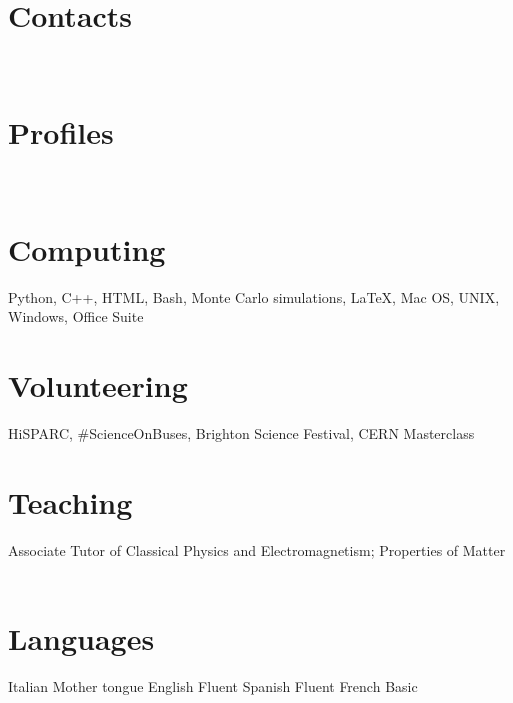 \documentclass[print]{cv} %
\newcommand{\profilepic}[1]{\renewcommand{\profilepic}{#1}}
\newlength\imagewidth
\newlength\imagescale
\begin{document}


\begin{aside} %
  \section{Contacts}
    \cvmail
    \cvnumberphone
    \cvaddress
  ~
  \section{Profiles}
    \cvsite
    \cvlinkedin
    \cvsussex
    \cvgit
  ~
  \section{Computing} 
      Python, C++, HTML, 
      Bash, Monte Carlo simulations, 
      \LaTeX, Mac OS, UNIX, Windows, Office Suite
  ~
  \section{Volunteering}
    HiSPARC, 
    \#ScienceOnBuses,
    Brighton Science Festival,
    CERN Masterclass
  ~
  \section{Teaching}
    Associate Tutor of Classical Physics and Electromagnetism; Properties of Matter
  ~
  \section{Languages}
    Italian Mother tongue
    English Fluent
    Spanish Fluent
    French Basic
  ~
\end{aside}
\end{document}
